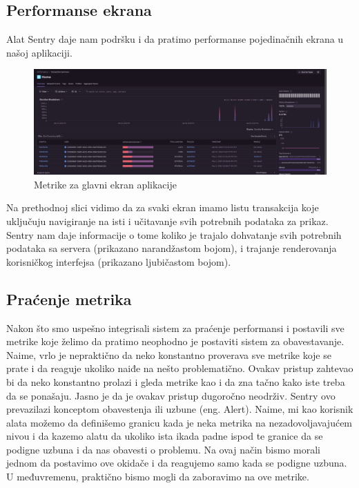 \documentclass[12pt,oneside]{memoir}
\begin{document}
\subsection{Performanse ekrana}

Alat Sentry daje nam podršku i da pratimo performanse pojedinačnih ekrana u našoj aplikaciji.

\begin{figure}[h]
    \centering
    \includegraphics[scale=0.2]{docs/images/chapterFive/sentryHomeScreen.png}
    \caption{Metrike za glavni ekran aplikacije}
    \label{fig:mainScreenMetrics}
\end{figure}

Na prethodnoj slici vidimo da za svaki ekran imamo listu transakcija koje uključuju navigiranje na isti i učitavanje svih potrebnih podataka za prikaz. Sentry nam daje informacije o tome koliko je trajalo dohvatanje svih potrebnih podataka sa servera (prikazano narandžastom bojom), i trajanje renderovanja korisničkog interfejsa (prikazano ljubičastom bojom).

\subsection{Praćenje metrika}

Nakon što smo uspešno integrisali sistem za praćenje performansi i postavili sve metrike koje želimo da pratimo neophodno je postaviti sistem za obavestavanje. Naime, vrlo je nepraktično da neko konstantno proverava sve metrike koje se prate i da reaguje ukoliko naiđe na nešto problematično. Ovakav pristup zahtevao bi da neko konstantno prolazi i gleda metrike kao i da zna tačno kako iste treba da se ponašaju. Jasno je da je ovakav pristup dugoročno neodrživ. Sentry ovo prevazilazi konceptom obavestenja ili uzbune (eng. Alert). Naime, mi kao korisnik alata možemo da definišemo granicu kada je neka metrika na nezadovoljavajućem nivou i da kazemo alatu da ukoliko ista ikada padne ispod te granice da se podigne uzbuna i da nas obavesti o problemu. Na ovaj način bismo morali jednom da postavimo ove okidače i da reagujemo samo kada se podigne uzbuna. U međuvremenu, praktično bismo mogli da zaboravimo na ove metrike.
\end{document}
